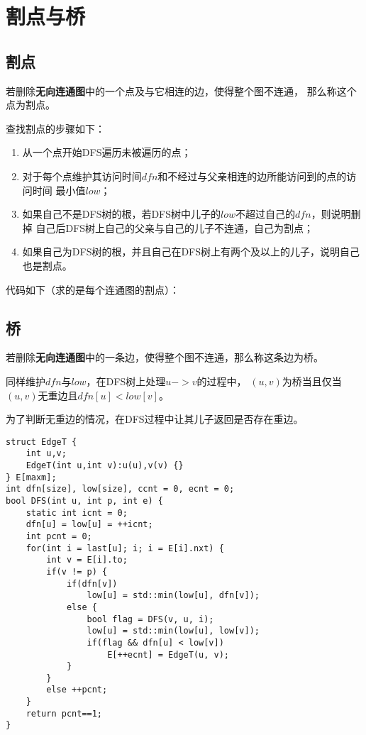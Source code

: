 \section{割点与桥}
\subsection{割点}
若删除{\bfseries 无向连通图}中的一个点及与它相连的边，使得整个图不连通，
那么称这个点为割点。

查找割点的步骤如下：
\begin{enumerate}
    \item 从一个点开始DFS遍历未被遍历的点；
    \item 对于每个点维护其访问时间$dfn$和不经过与父亲相连的边所能访问到的点的访问时间
    最小值$low$；
    \item 如果自己不是DFS树的根，若DFS树中儿子的$low$不超过自己的$dfn$，则说明删掉
        自己后DFS树上自己的父亲与自己的儿子不连通，自己为割点；
    \item 如果自己为DFS树的根，并且自己在DFS树上有两个及以上的儿子，说明自己也是割点。
\end{enumerate}

代码如下（求的是每个连通图的割点）：


\subsection{桥}
若删除{\bfseries 无向连通图}中的一条边，使得整个图不连通，那么称这条边为桥。

同样维护$dfn$与$low$，在DFS树上处理$u->v$的过程中，
$(u,v)$为桥当且仅当$(u,v)$无重边且$dfn[u]<low[v]$。

为了判断无重边的情况，在DFS过程中让其儿子返回是否存在重边。

\begin{lstlisting}
struct EdgeT {
    int u,v;
    EdgeT(int u,int v):u(u),v(v) {}
} E[maxm];
int dfn[size], low[size], ccnt = 0, ecnt = 0;
bool DFS(int u, int p, int e) {
    static int icnt = 0;
    dfn[u] = low[u] = ++icnt;
    int pcnt = 0;
    for(int i = last[u]; i; i = E[i].nxt) {
        int v = E[i].to;
        if(v != p) {
            if(dfn[v])
                low[u] = std::min(low[u], dfn[v]);
            else {
                bool flag = DFS(v, u, i);
                low[u] = std::min(low[u], low[v]);
                if(flag && dfn[u] < low[v])
                    E[++ecnt] = EdgeT(u, v);
            }
        }
        else ++pcnt;
    }
    return pcnt==1;
}
\end{lstlisting}
